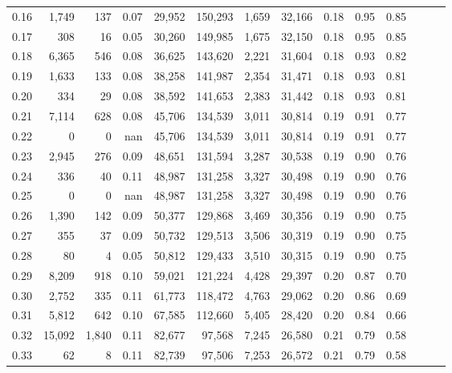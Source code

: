 \begin{tabular}{rrrrrrrrrrrrrr}
0.16 &   1,749 &    137 &  0.07 &   29,952 &  150,293 &   1,659 &  32,166 &  0.18 &  0.95 &      0.85 \\
0.17 &     308 &     16 &  0.05 &   30,260 &  149,985 &   1,675 &  32,150 &  0.18 &  0.95 &      0.85 \\
0.18 &   6,365 &    546 &  0.08 &   36,625 &  143,620 &   2,221 &  31,604 &  0.18 &  0.93 &      0.82 \\
0.19 &   1,633 &    133 &  0.08 &   38,258 &  141,987 &   2,354 &  31,471 &  0.18 &  0.93 &      0.81 \\
0.20 &     334 &     29 &  0.08 &   38,592 &  141,653 &   2,383 &  31,442 &  0.18 &  0.93 &      0.81 \\
0.21 &   7,114 &    628 &  0.08 &   45,706 &  134,539 &   3,011 &  30,814 &  0.19 &  0.91 &      0.77 \\
0.22 &       0 &      0 &   nan &   45,706 &  134,539 &   3,011 &  30,814 &  0.19 &  0.91 &      0.77 \\
0.23 &   2,945 &    276 &  0.09 &   48,651 &  131,594 &   3,287 &  30,538 &  0.19 &  0.90 &      0.76 \\
0.24 &     336 &     40 &  0.11 &   48,987 &  131,258 &   3,327 &  30,498 &  0.19 &  0.90 &      0.76 \\
0.25 &       0 &      0 &   nan &   48,987 &  131,258 &   3,327 &  30,498 &  0.19 &  0.90 &      0.76 \\
0.26 &   1,390 &    142 &  0.09 &   50,377 &  129,868 &   3,469 &  30,356 &  0.19 &  0.90 &      0.75 \\
0.27 &     355 &     37 &  0.09 &   50,732 &  129,513 &   3,506 &  30,319 &  0.19 &  0.90 &      0.75 \\
0.28 &      80 &      4 &  0.05 &   50,812 &  129,433 &   3,510 &  30,315 &  0.19 &  0.90 &      0.75 \\
0.29 &   8,209 &    918 &  0.10 &   59,021 &  121,224 &   4,428 &  29,397 &  0.20 &  0.87 &      0.70 \\
0.30 &   2,752 &    335 &  0.11 &   61,773 &  118,472 &   4,763 &  29,062 &  0.20 &  0.86 &      0.69 \\
0.31 &   5,812 &    642 &  0.10 &   67,585 &  112,660 &   5,405 &  28,420 &  0.20 &  0.84 &      0.66 \\
0.32 &  15,092 &  1,840 &  0.11 &   82,677 &   97,568 &   7,245 &  26,580 &  0.21 &  0.79 &      0.58 \\
0.33 &      62 &      8 &  0.11 &   82,739 &   97,506 &   7,253 &  26,572 &  0.21 &  0.79 &      0.58 \\

\end{tabular}
